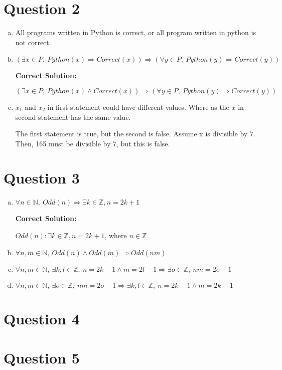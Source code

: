 \documentclass[12pt]{article}
\begin{document}
\section*{Question 2}
\begin{enumerate}[a.]
    \item

    All programs written in Python is correct, or all program written in python
    is not correct.

    \item

    $(\exists x \in P,\:Python(x) \Rightarrow Correct(x)) \Rightarrow (\forall y
    \in P,\:Python(y) \Rightarrow Correct(y))$

    \bigskip

    \textbf{Correct Solution:}

    $(\exists x \in P,\:Python(x) \land Correct(x)) \Rightarrow (\forall y \in P,\:
    Python(y) \Rightarrow Correct(y))$

    \item

    $x_1$ and $x_2$ in first statement could have different values. Where as the $x$ in
    second statement has the same value.

    \bigskip

    The first statement is true, but the second is false. Assume x is divisible by 7.
    Then, 165 must be divisible by 7, but this is false.

\end{enumerate}

\section*{Question 3}
\begin{enumerate}[a.]
    \item

    $\forall n \in \mathbb{N},\:Odd(n) \Rightarrow \exists k \in \mathbb{Z}, n = 2k + 1$

    \bigskip

    \textbf{Correct Solution:}

    $Odd(n): \exists k \in \mathbb{Z}, n = 2k + 1$, where $n \in \mathbb{Z}$

    \item

    $\forall n,m \in \mathbb{N},\:Odd(n) \land Odd(m) \Rightarrow Odd(nm)$

    \item

    $\forall n,m \in \mathbb{N},\: \exists k,l \in \mathbb{Z},\:n = 2k - 1 \land
    m = 2l - 1 \Rightarrow \exists o \in \mathbb{Z},\:nm = 2o - 1$

    \item

    $\forall n,m \in \mathbb{N},\:\exists o \in \mathbb{Z},\:nm = 2o - 1 \Rightarrow
    \exists k,l \in \mathbb{Z},\: n = 2k - 1 \land m = 2k - 1$

\end{enumerate}

\section*{Question 4}

\section*{Question 5}
\end{document}
